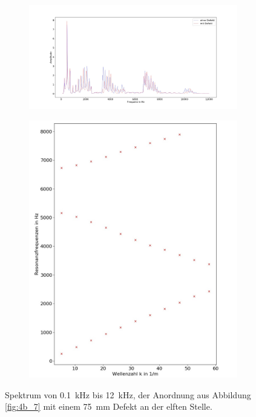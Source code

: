 \begin{figure}
\centering
\begin{subfigure}{0.65\textwidth}
\includegraphics[width=\textwidth]{content/Scripts/defect2.jpg}
\end{subfigure}
\begin{subfigure}{0.34\textwidth}
\includegraphics[width=\textwidth]{content/Scripts/4b_7_1b.jpg}
\end{subfigure}
\caption{Spektrum von 0.1~kHz bis 12~kHz, der Anordnung aus Abbildung \ref{fig:4b_7} mit einem 75~mm Defekt an der elften Stelle.}
\label{fig:4b_7_1b}
\end{figure}

